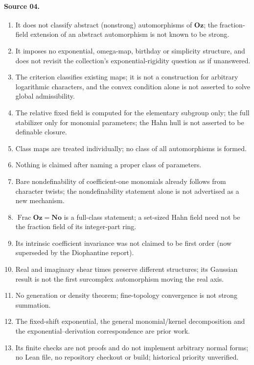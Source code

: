 \documentclass[11pt,oneside]{article}
\numberwithin{equation}{section}
\theoremstyle{definition}
\theoremstyle{remark}
\newcommand{\No}{\mathbf{No}}
\newcommand{\Oz}{\mathbf{Oz}}
\newcommand{\Frac}{\operatorname{Frac}}
\begin{document}
\paragraph{Source 04.}
\begin{enumerate}[itemsep=1pt]
\item It does not classify abstract (nonstrong) automorphisms of $\Oz$; the fraction-field
extension of an abstract automorphism is not known to be strong.
\item It imposes no exponential, omega-map, birthday or simplicity structure, and does not
revisit the collection's exponential-rigidity question as if unanswered.
\item The criterion classifies existing maps; it is not a construction for arbitrary
logarithmic characters, and the convex condition alone is not asserted to solve global
admissibility.
\item The relative fixed field is computed for the elementary subgroup only; the full
stabilizer only for monomial parameters; the Hahn hull is not asserted to be definable
closure.
\item Class maps are treated individually; no class of all automorphisms is formed.
\item Nothing is claimed after naming a proper class of parameters.
\item Bare nondefinability of coefficient-one monomials already follows from character
twists; the nondefinability statement alone is not advertised as a new mechanism.
\item $\Frac\Oz=\No$ is a full-class statement; a set-sized Hahn field need not be the
fraction field of its integer-part ring.
\item Its intrinsic coefficient invariance was not claimed to be first order (now
superseded by the Diophantine report).
\item Real and imaginary shear times preserve different structures; its Gaussian result is
not the first surcomplex automorphism moving the real axis.
\item No generation or density theorem; fine-topology convergence is not strong summation.
\item The fixed-shift exponential, the general monomial/kernel decomposition and the
exponential--derivation correspondence are prior work.
\item Its finite checks are not proofs and do not implement arbitrary normal forms; no Lean
file, no repository checkout or build; historical priority unverified.
\end{enumerate}
\end{document}
